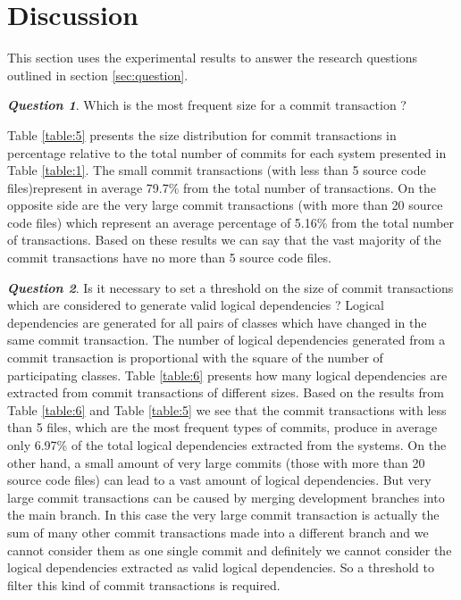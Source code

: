 \documentclass[a4paper,twoside]{article}
\begin{document}
\section{Discussion}
\label{sec:discussion}


This section uses the experimental results to answer the research questions outlined in section \ref{sec:question}.


\textit{\textbf{Question 1}}. Which is the most frequent size for a commit transaction ?  

Table \ref{table:5} presents the size distribution for commit transactions in percentage relative to the total number of commits for each system presented in Table \ref{table:1}. The small commit transactions (with less than 5 source code files)represent in average 79.7\% from the total number of transactions. On the opposite side are the very large commit transactions (with more than 20 source code files) which represent an average percentage of 5.16\% from the total number of transactions. Based on these results we can say that the vast majority of the commit transactions have no more than 5 source code files.

\textit{\textbf{Question 2}}. Is it necessary to set a threshold on the size of commit transactions which are considered to generate valid logical dependencies ?
Logical dependencies are generated for all pairs of classes which have changed in the same commit transaction. The number of logical dependencies generated from a commit transaction is proportional with the square of the number of participating classes.  Table \ref{table:6} presents how many logical dependencies are extracted from commit transactions of different sizes. 
Based on the results from Table \ref{table:6} and Table \ref{table:5} we see that the commit transactions with less than 5 files, which are the most frequent types of commits, produce in average only 6.97\% of the total logical dependencies extracted from the systems. On the other hand, a small amount of very large commits (those with more than 20 source code files) can lead to a vast amount of logical dependencies. But very large commit transactions can be caused by merging development branches into the main branch. In this case the very large commit transaction is actually the sum of many other commit transactions made into a different branch and we cannot consider them as one single commit and definitely we cannot consider the logical dependencies extracted as valid logical dependencies. So a threshold to filter this kind of commit transactions is required.
\end{document}
